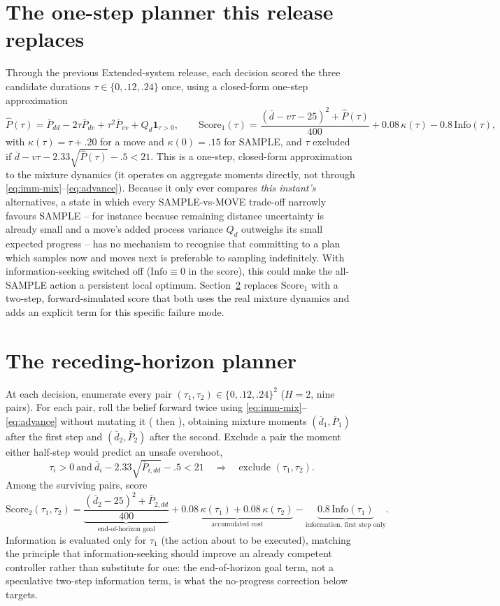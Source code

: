 \documentclass[11pt,a4paper]{article}
\newcommand{\code}[1]{\texttt{\detokenize{#1}}}
\begin{document}
\section{The one-step planner this release replaces}
\label{sec:old}
Through the previous Extended-system release, each decision scored the three candidate durations $\tau\in\{0,.12,.24\}$ once, using a closed-form one-step approximation
\[
\widehat P(\tau)=\bar P_{dd}-2\tau\bar P_{dv}+\tau^2\bar P_{vv}+Q_d\mathbf 1_{\tau>0},\qquad
\mathrm{Score}_1(\tau)=\frac{(\bar d-v\tau-25)^2+\widehat P(\tau)}{400}+0.08\,\kappa(\tau)-0.8\,\mathrm{Info}(\tau),
\]
with $\kappa(\tau)=\tau+.20$ for a move and $\kappa(0)=.15$ for SAMPLE, and $\tau$ excluded if $\bar d-v\tau-2.33\sqrt{\widehat P(\tau)}-.5<21$. This is a one-step, closed-form approximation to the mixture dynamics (it operates on aggregate moments directly, not through \eqref{eq:imm-mix}--\eqref{eq:advance}). Because it only ever compares \emph{this instant's} alternatives, a state in which every SAMPLE-vs-MOVE trade-off narrowly favours SAMPLE -- for instance because remaining distance uncertainty is already small and a move's added process variance $Q_d$ outweighs its small expected progress -- has no mechanism to recognise that committing to a plan which samples now and moves next is preferable to sampling indefinitely. With information-seeking switched off ($\mathrm{Info}\equiv0$ in the score), this could make the all-SAMPLE action a persistent local optimum. Section~\ref{sec:horizon} replaces $\mathrm{Score}_1$ with a two-step, forward-simulated score that both uses the real mixture dynamics and adds an explicit term for this specific failure mode.

\section{The receding-horizon planner}
\label{sec:horizon}
At each decision, enumerate every pair $(\tau_1,\tau_2)\in\{0,.12,.24\}^2$ ($H=2$, nine pairs). For each pair, roll the belief forward twice using \eqref{eq:imm-mix}--\eqref{eq:advance} without mutating it (\code{Belief.predicted} then \code{Belief._advance}), obtaining mixture moments $(\bar d_1,\bar P_1)$ after the first step and $(\bar d_2,\bar P_2)$ after the second. Exclude a pair the moment either half-step would predict an unsafe overshoot,
\[
\tau_i>0\ \text{and}\ \bar d_i-2.33\sqrt{\bar P_{i,dd}}-.5<21\quad\Longrightarrow\quad\text{exclude }(\tau_1,\tau_2).
\]
Among the surviving pairs, score
\begin{equation}\label{eq:horizon-score}
\mathrm{Score}_2(\tau_1,\tau_2)=\underbrace{\frac{(\bar d_2-25)^2+\bar P_{2,dd}}{400}}_{\text{end-of-horizon goal}}
+\underbrace{0.08\,\kappa(\tau_1)+0.08\,\kappa(\tau_2)}_{\text{accumulated cost}}
-\underbrace{0.8\,\mathrm{Info}(\tau_1)}_{\text{information, first step only}}.
\end{equation}
Information is evaluated only for $\tau_1$ (the action about to be executed), matching the principle that information-seeking should improve an already competent controller rather than substitute for one: the end-of-horizon goal term, not a speculative two-step information term, is what the no-progress correction below targets.
\end{document}
